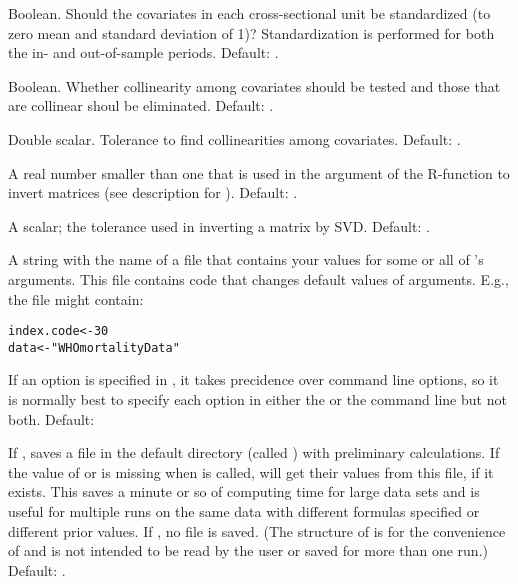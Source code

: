 \begin{Arguments}
\begin{ldescription}
\item[\code{standardize}] Boolean. Should the covariates in each
cross-sectional unit be standardized (to zero mean and standard
deviation of  1)? Standardization is performed for both the in-
and out-of-sample periods. Default: .

\item[\code{elim.collinear}] Boolean. Whether collinearity among covariates
should be tested and those that are collinear shoul be eliminated.
Default: .

\item[\code{tol}] Double scalar. Tolerance to find collinearities among
covariates. Default: .

\item[\code{solve.tol}] A real number smaller than one that is used in the
argument of the R-function  to invert matrices (see
description for ). Default: .

\item[\code{svdtol}] A scalar; the tolerance used in inverting a matrix by
SVD. Default: .

\item[\code{userfile}] A string with the name of a file that contains your
values for some or all of 's arguments. This file
contains \R{} code that changes default values of arguments. E.g.,
the file might contain:
\begin{alltt}
    index.code <- 30
    data <- "WHOmortalityData"
  \end{alltt}

If an option is specified in , it takes precidence over
command line options, so it is normally best to specify each option in
either the  or the command line but not both. Default: 

\item[\code{savetmp}] If ,  saves a file in the default directory
(called ) with preliminary calculations. If the value
of  or  is missing when  is
called, 
will get their values from this file, if it exists. This saves a
minute or so of computing time for large data sets and is useful for
multiple runs on the same data with different formulas specified or
different prior values. If , no file is saved. (The structure of
 is for the convenience of  and is not
intended to be read by the user or saved for more than one run.)
Default: .


\end{ldescription}
\end{Arguments}
